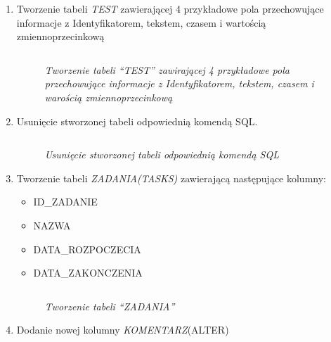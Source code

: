 \documentclass{article}
\begin{document}
\begin{enumerate}
\item Tworzenie tabeli \emph{TEST} zawierającej 4 przykładowe pola przechowujące informacje z Identyfikatorem, tekstem, czasem i wartością zmiennoprzecinkową

\begin{lstlisting}[style=SQL, caption=\textit{Tworzenie tabeli ``TEST'' zawirającej 4 przykładowe pola przechowujące informacje z Identyfikatorem, tekstem, czasem i warością zmiennoprzecinkową}]
\end{lstlisting}

\begin{figure}[H]
	\centering
	\caption{\textit{Tworzenie tabeli ``TEST'' zawirającej 4 przykładowe pola przechowujące informacje z Identyfikatorem, tekstem, czasem i warością zmiennoprzecinkową}}
\end{figure}

\item Usunięcie stworzonej tabeli odpowiednią komendą SQL.

\begin{lstlisting}[style=SQL,caption=\textit{Usunięcie stworzonej tabeli odpowiednią komendą SQL}]
\end{lstlisting}

\begin{figure}[H]
	\centering
	\caption{\textit{Usunięcie stworzonej tabeli odpowiednią komendą SQL}}
\end{figure}

\item Tworzenie tabeli \emph{ZADANIA(TASKS)} zawierającą następujące kolumny:
\begin{itemize}
\item ID\_ZADANIE
\item NAZWA
\item DATA\_ROZPOCZECIA
\item DATA\_ZAKONCZENIA
\end{itemize}

\begin{lstlisting}[style=SQL,caption=\textit{Tworzenie tabeli ``ZADANIA''}]
\end{lstlisting}

\begin{figure}[H]
	\centering
	\caption{\textit{Tworzenie tabeli ``ZADANIA''}}
\end{figure}

\item Dodanie nowej kolumny \emph{KOMENTARZ}(ALTER)


\end{enumerate}
\end{document}
